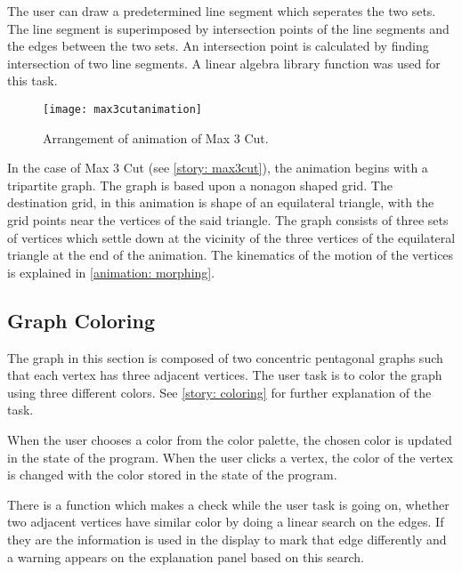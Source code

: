 The user can draw a predetermined line segment which seperates the two
sets. The line segment is superimposed by intersection points of the
line segments and the edges between the two sets. An intersection point
is calculated by finding intersection of two line segments. A linear algebra
library function was used for this task.


\begin{figure}[h]
\centering
\texttt{[image: max3cutanimation]}
\caption{
        Arrangement of animation of Max 3 Cut.
        }
\label{animationfigure: max3cut}
\end{figure}
In the case of Max 3 Cut (see \autoref{story: max3cut}), the animation begins
with a tripartite graph. The graph is based upon a nonagon shaped grid. The
destination grid, in this animation is shape of an equilateral triangle, with
the grid points near the vertices of the said triangle. The graph consists of
three sets of vertices which settle down at the vicinity of the three vertices
of the equilateral triangle at the end of the animation. The kinematics of the
motion of the vertices is explained in \autoref{animation: morphing}.

\subsection{Graph Coloring}
The graph in this section is composed of two concentric pentagonal graphs such
that each vertex has three adjacent vertices. The user task is to color the
graph using three different colors. See \autoref{story: coloring} for further
explanation of the task.

When the user chooses a color from the color palette, the chosen color is
updated in the state of the program. When the user clicks a vertex, the color
of the vertex is changed with the color stored in the state of the program.

There is a function which makes a check while the user task is going on, whether
two adjacent vertices have similar color by doing a linear search on the edges.
If they are the information is used in the display to mark that edge differently
and a warning appears on the explanation panel based on this search.

